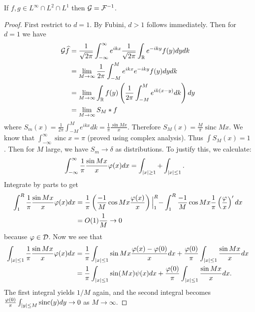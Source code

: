 \documentclass[10pt, twoside]{article}
\begin{document}
    \begin{thm} If $f,g \in L^{\infty} \cap L^2 \cap L^1$ then $\mathcal{G} =
        \mathcal{F}^{-1}$.  \begin{proof} First restrict to $d=1$. By Fubini, $d >
            1$ follows immediately. Then for $d=1$ we have \begin{align*}
                \mathcal{G}\widehat{f} &= \frac{1}{\sqrt{2\pi}}
                \int_{-\infty}^{\infty} e^{ikx} \frac{1}{\sqrt{2\pi}}\int_{\mathbb{R}}
                e^{-iky} f(y) dy dk \\ &= \lim_{M \to \infty} \frac{1}{2\pi}
                \int_{-M}^M e^{ikx} e^{-iky} f(y) dy dk \\ &= \lim_{M \to
                \infty} \int_{\mathbb{R}} f(y) \left( \frac{1}{2\pi} \int_{-M}^M
                e^{ik(x-y)} dk \right) dy \\ &= \lim_{M \to \infty} S_M * f
            \end{align*} where $S_m(x) = \frac{1}{2\pi} \int_{-M}^{M} e^{ikx}
            dk = \frac{1}{\pi} \frac{\sin Mx}{x}$. Therefore $S_M(x) =
            \frac{M}{\pi} \operatorname{sinc} Mx$. We know that
            $\int_{-\infty}^{\infty} \operatorname{sinc} x = \pi$ (proved using
            complex analysis). Thus $\int S_M(x) = 1$. Then for $M$ large, we
            have $S_m \to \delta$ as distributions. To justify this, we
            calculate: \begin{align*} \int_{-\infty}^{\infty} \frac{1}{\pi}
                \frac{\sin Mx}{x} \varphi(x) dx &= \int_{\lvert x\rvert \geq 1} +
                \int_{\lvert x\rvert \leq 1}.  \end{align*} Integrate by parts to get
                \begin{align*} \int_{1}^R \frac{1}{\pi} \frac{\sin Mx}{x}
                    \varphi(x) dx &= \frac{1}{\pi} \left( \frac{-1}{M} \cos Mx
                        \frac{\varphi(x)}{x} \right)\Bigl\lvert_{1}^R -
                        \int_1^R \frac{-1}{M} \cos Mx \frac{1}{\pi} \left(
                        \frac{\varphi}{x} \right)' dx \\ &= O(1) \frac{1}{M}
                        \to 0 \end{align*} because $\varphi \in \mathcal{D}$. Now we
                        see that \begin{align*} \int_{\lvert x\rvert \leq 1}
                            \frac{1}{\pi} \frac{\sin Mx}{x} \varphi(x) dx &=
                            \frac{1}{\pi} \int_{\lvert x\rvert \leq 1} \sin Mx
                            \frac{\varphi(x) - \varphi(0)}{x} dx +
                            \frac{\varphi(0)}{\pi} \int_{\lvert x\rvert \leq 1}
                            \frac{\sin Mx}{x} dx \\ &= \frac{1}{\pi}
                        \int_{\lvert x\rvert \leq 1} \sin (Mx) \psi(x) dx +
                    \frac{\varphi(0)}{\pi} \int_{\lvert x\rvert \leq 1} \frac{\sin
                Mx}{x} dx.  \end{align*} The first integral yields $1/M$ again,
                and the second integral becomes $\frac{\varphi(0)}{\pi}
                \int_{\lvert y\rvert \leq M} \operatorname{sinc}(y) dy \to 0 $ as $M
                \to \infty$.  \end{proof} \end{thm}
\end{document}
